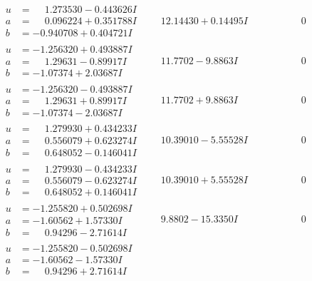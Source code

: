 \documentclass[1p]{elsarticle_modified}
\theoremstyle{definition}
\begin{document}
$$\begin{array}{c|c|c}
\begin{aligned}
u &= \phantom{-}1.273530 - 0.443626 I \\
a &= \phantom{-}0.096224 + 0.351788 I \\
b &= -0.940708 + 0.404721 I\end{aligned}
 & \phantom{-}12.14430 + 0.14495 I & \phantom{-0.000000 } 0 \\ \hline\begin{aligned}
u &= -1.256320 + 0.493887 I \\
a &= \phantom{-}1.29631 - 0.89917 I \\
b &= -1.07374 + 2.03687 I\end{aligned}
 & \phantom{-}11.7702 - 9.8863 I & \phantom{-0.000000 } 0 \\ \hline\begin{aligned}
u &= -1.256320 - 0.493887 I \\
a &= \phantom{-}1.29631 + 0.89917 I \\
b &= -1.07374 - 2.03687 I\end{aligned}
 & \phantom{-}11.7702 + 9.8863 I & \phantom{-0.000000 } 0 \\ \hline\begin{aligned}
u &= \phantom{-}1.279930 + 0.434233 I \\
a &= \phantom{-}0.556079 + 0.623274 I \\
b &= \phantom{-}0.648052 - 0.146041 I\end{aligned}
 & \phantom{-}10.39010 - 5.55528 I & \phantom{-0.000000 } 0 \\ \hline\begin{aligned}
u &= \phantom{-}1.279930 - 0.434233 I \\
a &= \phantom{-}0.556079 - 0.623274 I \\
b &= \phantom{-}0.648052 + 0.146041 I\end{aligned}
 & \phantom{-}10.39010 + 5.55528 I & \phantom{-0.000000 } 0 \\ \hline\begin{aligned}
u &= -1.255820 + 0.502698 I \\
a &= -1.60562 + 1.57330 I \\
b &= \phantom{-}0.94296 - 2.71614 I\end{aligned}
 & \phantom{-}9.8802 - 15.3350 I & \phantom{-0.000000 } 0 \\ \hline\begin{aligned}
u &= -1.255820 - 0.502698 I \\
a &= -1.60562 - 1.57330 I \\
b &= \phantom{-}0.94296 + 2.71614 I\end{aligned}

\end{array}$$
\end{document}
